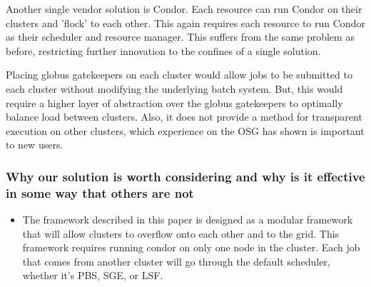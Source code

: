 \documentclass[11pt]{article}
\begin{document}
Another single vendor solution is Condor.  Each resource can run Condor on their clusters and 'flock' \cite{epema1996worldwide} to each other.  This again requires each resource to run Condor as their scheduler and resource manager.  This suffers from the same problem as before, restricting further innovation to the confines of a single solution.

Placing globus gatekeepers on each cluster would allow jobs to be submitted to each cluster without modifying the underlying batch system.  But, this would require a higher layer of abstraction over the globus gatekeepers to optimally balance load between clusters.  Also, it does not provide a method for transparent execution on other clusters, which experience on the OSG has shown is important to new users.









\subsubsection* {Why our solution is worth considering and why is it effective
in some way that others are not}

\begin{itemize}
\item The framework described in this paper is designed as a modular framework that will allow clusters to overflow onto each other and to the grid.  This framework requires running condor on only one node in the cluster.  Each job that comes from another cluster will go through the default scheduler, whether it's PBS, SGE, or LSF.


\end{itemize}
\end{document}
